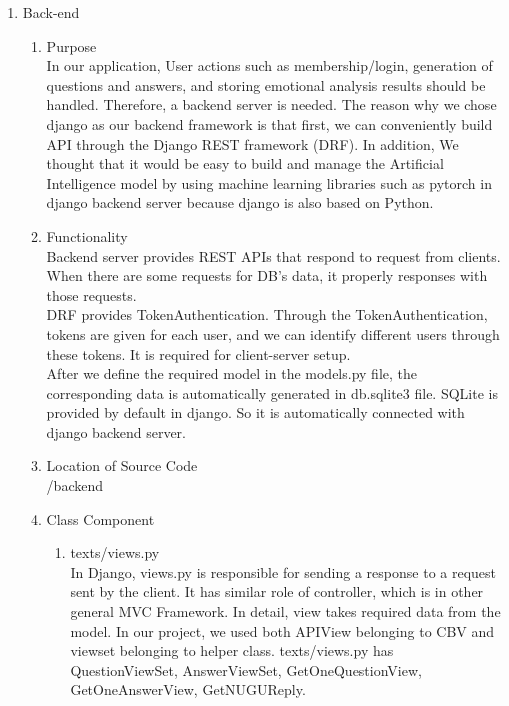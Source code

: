 \documentclass[conference]{IEEEtran}
\begin{document}
\begin{enumerate}
\begin{enumerate}
       \end{enumerate}
    \vspace{0.5cm}
    \item Back-end
        \begin{enumerate}
        \item Purpose
        \\In our application, User actions such as membership/login, generation of questions and answers, and storing emotional analysis results should be handled. Therefore, a backend server is needed. The reason why we chose django as our backend framework is that first, we can conveniently build API through the Django REST framework (DRF). In addition, We thought that it would be easy to build and manage the Artificial Intelligence model by using machine learning libraries such as pytorch in django backend server because django is also based on Python.
        \newline
        \item Functionality
        \\Backend server provides REST APIs that respond to request from clients. When there are some requests for DB’s data, it properly responses with those requests.\\
        DRF provides TokenAuthentication. Through the TokenAuthentication, tokens are given for each user, and we can identify different users through these tokens. It is required for client-server setup.\\
        After we define the required model in the models.py file, the corresponding data is automatically generated in db.sqlite3 file. SQLite is provided by default in django. So it is automatically connected with django backend server.
        \newline
        \item Location of Source Code
        \\/backend
        \newline
        \item Class Component
        \begin{enumerate}
            \item texts/views.py
            \\In Django, views.py is responsible for sending a response to a request sent by the client. It has similar role of controller, which is in other general MVC Framework. In detail, view takes required data from the model. In our project, we used both APIView belonging to CBV and viewset belonging to helper class. texts/views.py has QuestionViewSet, AnswerViewSet, GetOneQuestionView, GetOneAnswerView, GetNUGUReply.

\end{enumerate}
\end{enumerate}
\end{enumerate}
\end{document}
